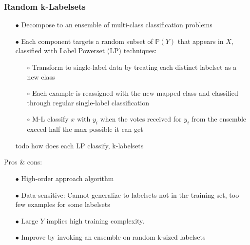 \documentclass{beamer}
\begin{document}
\begin{frame}
\frametitle{Random k-Labelsets}
\begin{itemize}
\item[$\bullet$] Decompose to an ensemble of multi-class classification problems
\item[$\bullet$] Each component targets a random subset of $\mathbb{P}(Y)$ that appears in $X$, classified with Label Powerset (LP) techniques:
\begin{itemize}
\item[$\circ$] Transform to single-label data by treating each distinct labelset as a new class
\item[$\circ$] Each example is reassigned with the new mapped class and classified through regular single-label classification
\item[$\circ$] M-L classify $x$ with $y_i$ when the votes received for $y_i$ from the ensemble exceed half the max possible it can get
\end{itemize}
todo how does each LP classify, k-labelsets
\end{itemize}
Pros \& cons:
\begin{itemize}
\item[$\bullet$] High-order approach algorithm
\item[$\bullet$] Data-sensitive: Cannot generalize to labelsets not in the training set, too few examples for some labelsets
\item[$\bullet$] Large $Y$ implies high training complexity.
\item[$\bullet$] Improve by invoking an ensemble on random k-sized labelsets
\end{itemize}
\end{frame}
\end{document}
